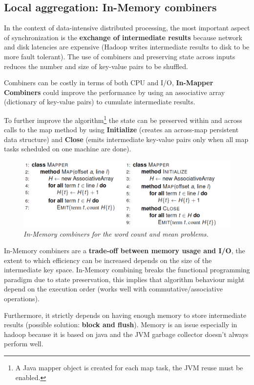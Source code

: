 \subsection{Local aggregation: In-Memory combiners}
In the context of data-intensive distributed processing, the most important aspect of synchronization is the \textbf{exchange of intermediate results} because network and disk latencies are expensive (Hadoop writes intermediate results to disk to be more fault tolerant). The use of combiners and preserving state across inputs reduces the number and size of key-value pairs to be shuffled.
\par
Combiners can be costly in terms of both CPU and I/O, \textbf{In-Mapper Combiners} could improve the performance by using an associative array (dictionary of key-value pairs) to cumulate intermediate results.
\par
To further improve the algorithm\footnote{A Java mapper object is created for each map task, the JVM reuse must be enabled.} the state can be preserved within and across calls to the map method by using \textbf{Initialize} (creates an across-map persistent data structure) and \textbf{Close} (emits intermediate key-value pairs only when all map tasks scheduled on one machine are done).
\begin{figure}[h!]
	\includegraphics[width=\linewidth]{images/inmappercombiners.png}
	\caption{\textit{In-Memory combiners for the word count and mean problems.}}
\end{figure}
\par
In-Memory combiners are a \textbf{trade-off between memory usage and I/O}, the extent to which efficiency can be increased depends on the size of the intermediate key space. In-Memory combining breaks the functional programming paradigm due to state preservation, this implies that algorithm behaviour might depend on the execution order (works well with commutative/associative operations).
\par\noindent
Furthermore, it strictly depends on having enough memory to store intermediate results (possible solution: \textbf{block and flush}). Memory is an issue especially in hadoop because it is based on java and the JVM garbage collector doesn't always perform well.
